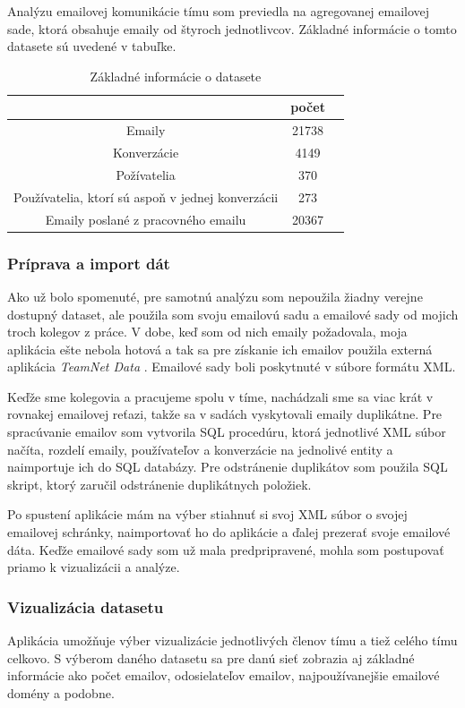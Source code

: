 \documentclass[slovak,master,public,dept460,male,cpdeclaration,oneside]{diploma}
\begin{document}
Analýzu emailovej komunikácie tímu som previedla na agregovanej emailovej sade, ktorá obsahuje emaily od štyroch jednotlivcov. Základné informácie o tomto datasete sú uvedené v tabuľke. 

\begin{table}[h!]
\centering
\begin{tabular}{ c c c }
  &  počet \\ 
 \hline
 Emaily  & 21738 \\  
 Konverzácie  & 4149  \\
 Požívatelia  & 370 \\
 Používatelia, ktorí sú aspoň v jednej konverzácii  & 273 \\  
 Emaily poslané z pracovného emailu  & 20367  \\
\end{tabular}
\caption{Základné informácie o datasete}
\label{tabulkazaklinfo}
\end{table} 

\subsubsection{Príprava a import dát}
Ako už bolo spomenuté, pre samotnú analýzu som nepoužila žiadny verejne dostupný dataset, ale použila som svoju emailovú sadu a emailové sady od mojich troch kolegov z práce. V dobe, keď som od nich emaily požadovala, moja aplikácia ešte nebola hotová a tak sa pre získanie ich emailov použila externá aplikácia \textit{TeamNet Data} \cite{5}. Emailové sady boli poskytnuté v súbore formátu XML.


Keďže sme kolegovia a pracujeme spolu v tíme, nachádzali sme sa viac krát v rovnakej emailovej reťazi, takže sa v sadách vyskytovali emaily duplikátne. Pre spracúvanie emailov som vytvorila SQL procedúru, ktorá jednotlivé XML súbor načíta, rozdelí emaily, používateľov a konverzácie na jednolivé entity a naimportuje ich do SQL databázy. Pre odstránenie duplikátov som použila SQL skript, ktorý zaručil odstránenie duplikátnych položiek. 

Po spustení aplikácie mám na výber stiahnuť si svoj XML súbor o svojej emailovej schránky, naimportovať ho do aplikácie a ďalej prezerať svoje emailové dáta. Keďže emailové sady som už mala predpripravené, mohla som postupovať priamo k vizualizácii a analýze.



\subsubsection{Vizualizácia datasetu}
Aplikácia umožňuje výber vizualizácie jednotlivých členov tímu a tiež celého tímu celkovo. S výberom daného datasetu sa pre danú sieť zobrazia aj základné informácie ako počet emailov, odosielateľov emailov, najpoužívanejšie emailové domény a podobne.
\end{document}

